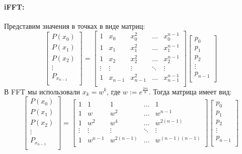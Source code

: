 \documentclass{article}
\begin{document}
  \paragraph{iFFT:}
  Представим значения в точках в виде матриц:
  \[
  \begin{bmatrix}
  P(x_0)\\
  P(x_1)\\
  P(x_2)\\
  \vdots\\
  P_{x_{n-1}}\\
  \end{bmatrix}
  = 
  \begin{bmatrix}
  1&x_0&x_0^2&\hdots&x_0^{n-1}\\
  1&x_1&x_1^2&\hdots&x_1^{n-1}\\
  1&x_2&x_2^2&\hdots&x_2^{n-1}\\
  \vdots&\vdots&\vdots&\ddots&\vdots\\
  1&x_{n-1}&x_{n-1}^2&\hdots&x_{n-1}^{n-1}\\
  \end{bmatrix}
  \begin{bmatrix}
  p_0\\
  p_1\\
  p_2\\
  \vdots\\
  p_{n-1}\\
  \end{bmatrix}
  \]
  В FFT мы использовали $x_k=w^k$, где $w:=e^{\frac{2\pi i}{n}}$. Тогда матрица имеет вид:
  \[
  \begin{bmatrix}
  P(x_0)\\
  P(x_1)\\
  P(x_2)\\
  \vdots\\
  P_{x_{n-1}}\\
  \end{bmatrix}
  = 
  \begin{bmatrix}
  1&1&1&\hdots&1\\
  1&w&w^2&\hdots&w^{n-1}\\
  1&w^2&w^4&\hdots&w^{2(n-1)}\\
  \vdots&\vdots&\vdots&\ddots&\vdots\\
  1&w^{n-1}&w^{2(n-1)}&\hdots&w^{(n-1)(n-1)}\\
  \end{bmatrix}
  \begin{bmatrix}
  p_0\\
  p_1\\
  p_2\\
  \vdots\\
  p_{n-1}\\
  \end{bmatrix}
  \]
\end{document}
